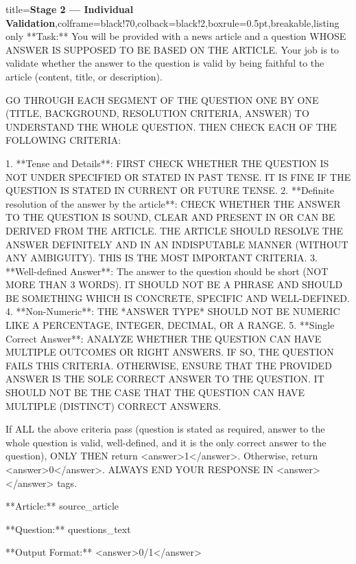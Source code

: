 \documentclass{article} %
\begin{document}
\begin{tcblisting}{title={\textbf{Stage 2 --- Individual Validation}},colframe=black!70,colback=black!2,boxrule=0.5pt,breakable,listing only}
**Task:** You will be provided with a news article and a question WHOSE ANSWER IS SUPPOSED TO BE BASED ON THE ARTICLE. Your job is to validate whether the answer to the question is valid by being faithful to the article (content, title, or description).

GO THROUGH EACH SEGMENT OF THE QUESTION ONE BY ONE (TITLE, BACKGROUND, RESOLUTION CRITERIA, ANSWER) TO UNDERSTAND THE WHOLE QUESTION. THEN CHECK EACH OF THE FOLLOWING CRITERIA: 

1. **Tense and Details**: FIRST CHECK WHETHER THE QUESTION IS NOT UNDER SPECIFIED OR STATED IN PAST TENSE. IT IS FINE IF THE QUESTION IS STATED IN CURRENT OR FUTURE TENSE. 
2. **Definite resolution of the answer by the article**: CHECK WHETHER THE ANSWER TO THE QUESTION IS SOUND, CLEAR AND PRESENT IN OR CAN BE DERIVED FROM THE ARTICLE. THE ARTICLE SHOULD RESOLVE THE ANSWER DEFINITELY AND IN AN INDISPUTABLE MANNER (WITHOUT ANY AMBIGUITY). THIS IS THE MOST IMPORTANT CRITERIA.
3. **Well-defined Answer**: The answer to the question should be short (NOT MORE THAN 3 WORDS). IT SHOULD NOT BE A PHRASE AND SHOULD BE SOMETHING WHICH IS CONCRETE, SPECIFIC AND WELL-DEFINED.
4. **Non-Numeric**: THE *ANSWER TYPE* SHOULD NOT BE NUMERIC LIKE A PERCENTAGE, INTEGER, DECIMAL, OR A RANGE.
5. **Single Correct Answer**: ANALYZE WHETHER THE QUESTION CAN HAVE MULTIPLE OUTCOMES OR RIGHT ANSWERS. IF SO, THE QUESTION FAILS THIS CRITERIA. OTHERWISE, ENSURE THAT THE PROVIDED ANSWER IS THE SOLE CORRECT ANSWER TO THE QUESTION. IT SHOULD NOT BE THE CASE THAT THE QUESTION CAN HAVE MULTIPLE (DISTINCT) CORRECT ANSWERS.

If ALL the above criteria pass (question is stated as required, answer to the whole question is valid, well-defined, and it is the only correct answer to the question), ONLY THEN return <answer>1</answer>. Otherwise, return <answer>0</answer>. ALWAYS END YOUR RESPONSE IN <answer> </answer> tags.

**Article:**
{source_article}

**Question:**
{questions_text}

**Output Format:**
<answer>0/1</answer>
\end{tcblisting}
\end{document}
